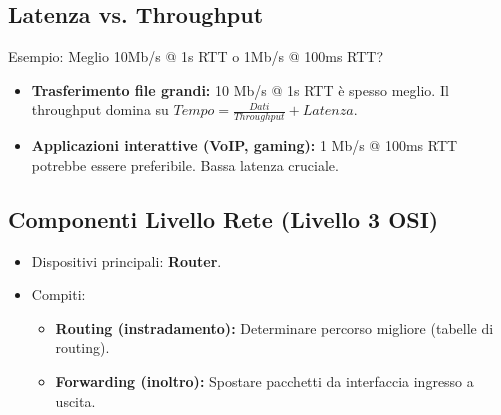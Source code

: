 \documentclass{article}
\begin{document}
\subsection{Latenza vs. Throughput}
Esempio: Meglio 10Mb/s @ 1s RTT o 1Mb/s @ 100ms RTT?
\begin{itemize}
    \item \textbf{Trasferimento file grandi:} 10 Mb/s @ 1s RTT è spesso meglio. Il throughput domina su $Tempo = \frac{Dati}{Throughput} + Latenza$.
    \item \textbf{Applicazioni interattive (VoIP, gaming):} 1 Mb/s @ 100ms RTT potrebbe essere preferibile. Bassa latenza cruciale.
\end{itemize}

\subsection{Componenti Livello Rete (Livello 3 OSI)}
\begin{itemize}
    \item Dispositivi principali: \textbf{Router}.
    \item Compiti:
    \begin{itemize}
        \item \textbf{Routing (instradamento):} Determinare percorso migliore (tabelle di routing).
        \item \textbf{Forwarding (inoltro):} Spostare pacchetti da interfaccia ingresso a uscita.
    \end{itemize}
\end{itemize}
\end{document}
